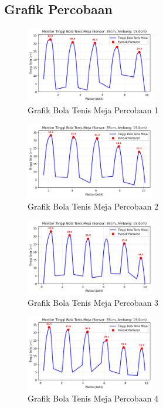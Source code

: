 \subsection{Grafik Percobaan}
\begin{figure}[htbp]
    \centering
    \includegraphics[width=0.5\textwidth]{chapters/DataPercobaan/Grafik_Bola_Tenis_Meja_1.png}
    \caption{Grafik Bola Tenis Meja Percobaan 1}
\end{figure}
\begin{figure}[htbp]
    \centering
    \includegraphics[width=0.5\textwidth]{chapters/DataPercobaan/Grafik_Bola_Tenis_Meja_2.png}
    \caption{Grafik Bola Tenis Meja Percobaan 2}
\end{figure}
\begin{figure}[htbp]
    \centering
    \includegraphics[width=0.5\textwidth]{chapters/DataPercobaan/Grafik_Bola_Tenis_Meja_3.png}
    \caption{Grafik Bola Tenis Meja Percobaan 3}
\end{figure}
\begin{figure}[htbp]
    \centering
    \includegraphics[width=0.5\textwidth]{chapters/DataPercobaan/Grafik_Bola_Tenis_Meja_4.png}
    \caption{Grafik Bola Tenis Meja Percobaan 4}
\end{figure}
